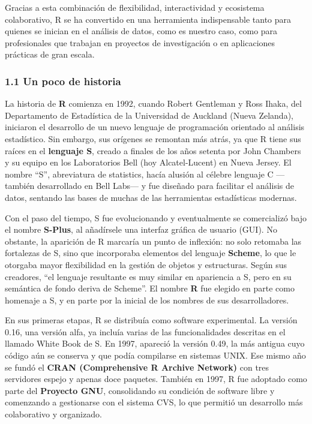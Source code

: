 \documentclass[
  letterpaper,
  DIV=11,
  numbers=noendperiod]{scrartcl}
\begin{document}
Gracias a esta combinación de flexibilidad, interactividad y ecosistema
colaborativo, R se ha convertido en una herramienta indispensable tanto
para quienes se inician en el análisis de datos, como es nuestro caso,
como para profesionales que trabajan en proyectos de investigación o en
aplicaciones prácticas de gran escala.

\hypertarget{un-poco-de-historia}{%
\subsubsection{1.1 Un poco de historia}\label{un-poco-de-historia}}

La historia de \textbf{R} comienza en 1992, cuando Robert Gentleman y
Ross Ihaka, del Departamento de Estadística de la Universidad de
Auckland (Nueva Zelanda), iniciaron el desarrollo de un nuevo lenguaje
de programación orientado al análisis estadístico. Sin embargo, sus
orígenes se remontan más atrás, ya que R tiene sus raíces en el
\textbf{lenguaje S}, creado a finales de los años setenta por John
Chambers y su equipo en los Laboratorios Bell (hoy Alcatel-Lucent) en
Nueva Jersey. El nombre ``S'', abreviatura de statistics, hacía alusión
al célebre lenguaje C ---también desarrollado en Bell Labs--- y fue
diseñado para facilitar el análisis de datos, sentando las bases de
muchas de las herramientas estadísticas modernas.

Con el paso del tiempo, S fue evolucionando y eventualmente se
comercializó bajo el nombre \textbf{S-Plus}, al añadírsele una interfaz
gráfica de usuario (GUI). No obstante, la aparición de R marcaría un
punto de inflexión: no solo retomaba las fortalezas de S, sino que
incorporaba elementos del lenguaje \textbf{Scheme}, lo que le otorgaba
mayor flexibilidad en la gestión de objetos y estructuras. Según sus
creadores, ``el lenguaje resultante es muy similar en apariencia a S,
pero en su semántica de fondo deriva de Scheme''. El nombre \textbf{R}
fue elegido en parte como homenaje a S, y en parte por la inicial de los
nombres de sus desarrolladores.

En sus primeras etapas, R se distribuía como software experimental. La
versión 0.16, una versión alfa, ya incluía varias de las funcionalidades
descritas en el llamado White Book de S. En 1997, apareció la versión
0.49, la más antigua cuyo código aún se conserva y que podía compilarse
en sistemas UNIX. Ese mismo año se fundó el \textbf{CRAN (Comprehensive
R Archive Network)} con tres servidores espejo y apenas doce paquetes.
También en 1997, R fue adoptado como parte del \textbf{Proyecto GNU},
consolidando su condición de software libre y comenzando a gestionarse
con el sistema CVS, lo que permitió un desarrollo más colaborativo y
organizado.
\end{document}
